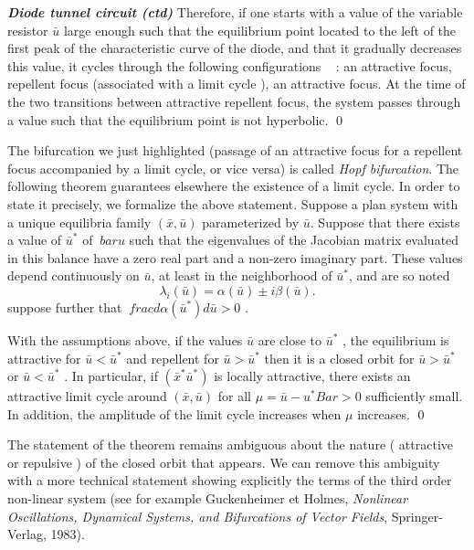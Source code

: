 \begin{exemple} {\em\bf Diode tunnel circuit (ctd)}
Therefore, if one starts with a value of the variable resistor $\bar u$ large enough such that the equilibrium point
located to the left of the first peak of the characteristic curve of the diode, and that
it gradually decreases this value, it cycles through the following configurations ~ : 
an attractive focus, repellent focus (associated with a limit cycle ), an
attractive focus. At the time of the two transitions between attractive
repellent focus, the system passes through a value such that the equilibrium point is not
hyperbolic.
\qed
\end{exemple}

The bifurcation we just highlighted (passage of an attractive focus for a repellent focus accompanied by a limit cycle, or vice versa) is
called {\em Hopf bifurcation}. The following theorem guarantees elsewhere
the existence of a limit cycle. In order to state it precisely, we formalize the above statement. 
Suppose a plan system with a unique equilibria family $(\bar x , \bar u)$ parameterized by $\bar u$. 
Suppose that there exists a value of $\bar u^*$ of $ \ bar u $ such that the eigenvalues
of the Jacobian matrix evaluated in this balance have a zero real part and a non-zero imaginary part. 
These values depend continuously on $\bar u$, at least in the neighborhood of $\bar u ^*$, 
and are so noted $$ \lambda_i ( \bar u) = \alpha ( \bar u) \pm i \beta ( \bar u).$$ 
suppose further that $\ frac{ d \alpha ( \bar u ^*) {d} \bar u} > 0$ .

\begin{theoreme}
  With the assumptions above, if the values
 $ \bar u $ are close to $ \bar u^* $ , the equilibrium is attractive
 for $ \bar u < \bar u^* $ and repellent for $ \bar u > \bar u^* $ then
 it is a closed orbit for $ \bar u > \bar u^* $ or $ \bar u < \bar u^* $ .
 In particular, if $ ( \bar x^* \bar u^*)$ is locally attractive, there exists an attractive limit cycle around
 $ (\bar x , \bar u) $ for all $ \mu = \bar u-u^{*} Bar > 0$ sufficiently small.
In addition, the amplitude of the limit cycle increases when $ \mu $ increases.
\qed
\end{theoreme}
   
\begin{remarque}
The statement of the theorem remains
ambiguous about the nature ( attractive or repulsive ) of the closed orbit
that appears. We can remove this ambiguity with
a more technical statement showing explicitly
the terms of the third order non-linear system
(see for example Guckenheimer et Holmes, 
{\em Nonlinear Oscillations, Dynamical Systems, and Bifurcations of Vector 
Fields}, Springer-Verlag, 1983). 
\end{remarque}

